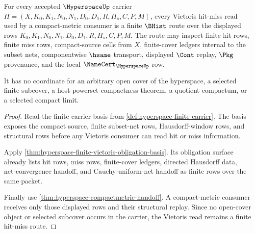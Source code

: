 \begin{theorem}
\label{thm:hyperspace-vietoris-finite-subcover-avoidance}
For every accepted $\HyperspaceUp$ carrier $H=(X,K_0,K_1,N_0,N_1,D_0,D_1,R,H_s,C,P,M)$, every Vietoris hit-miss read used by a compact-metric consumer is a finite $\BHist$ route over the displayed rows $K_0,K_1,N_0,N_1,D_0,D_1,R,H_s,C,P,M$. The route may inspect finite hit rows, finite miss rows, compact-source cells from $X$, finite-cover ledgers internal to the subset nets, componentwise $\hsame$ transport, displayed $\Cont$ replay, $\Pkg$ provenance, and the local $\NameCert_{\HyperspaceUp}$ row.

It has no coordinate for an arbitrary open cover of the hyperspace, a selected finite subcover, a host powerset compactness theorem, a quotient compactum, or a selected compact limit.
\end{theorem}
\begin{proof}
Read the finite carrier basis from \autoref{def:hyperspace-finite-carrier}. The basis exposes the compact source, finite subset-net rows, Hausdorff-window rows, and structural rows before any Vietoris consumer can read hit or miss information.

Apply \autoref{thm:hyperspace-finite-vietoris-obligation-basis}. Its obligation surface already lists hit rows, miss rows, finite-cover ledgers, directed Hausdorff data, net-convergence handoff, and Cauchy-uniform-net handoff as finite rows over the same packet.

Finally use \autoref{thm:hyperspace-compactmetric-handoff}. A compact-metric consumer receives only those displayed rows and their structural replay. Since no open-cover object or selected subcover occurs in the carrier, the Vietoris read remains a finite hit-miss route.
\end{proof}

